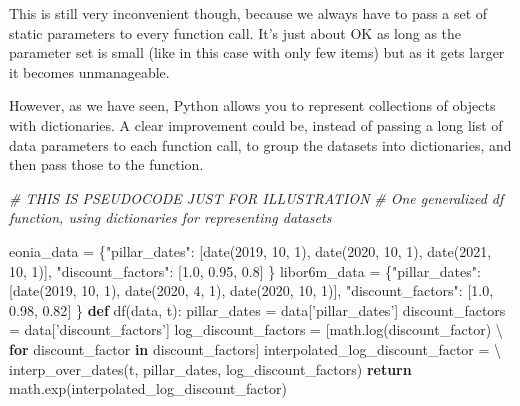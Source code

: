 \documentclass[11pt]{article}
\newenvironment{Shaded}{}{}
\newcommand{\KeywordTok}[1]{\textcolor[rgb]{0.00,0.44,0.13}{\textbf{{#1}}}}
\newcommand{\DecValTok}[1]{\textcolor[rgb]{0.25,0.63,0.44}{{#1}}}
\newcommand{\FloatTok}[1]{\textcolor[rgb]{0.25,0.63,0.44}{{#1}}}
\newcommand{\StringTok}[1]{\textcolor[rgb]{0.25,0.44,0.63}{{#1}}}
\newcommand{\CommentTok}[1]{\textcolor[rgb]{0.38,0.63,0.69}{\textit{{#1}}}}
\newcommand{\NormalTok}[1]{{#1}}
\newcommand{\ControlFlowTok}[1]{\textcolor[rgb]{0.00,0.44,0.13}{\textbf{{#1}}}}
\newcommand{\OperatorTok}[1]{\textcolor[rgb]{0.40,0.40,0.40}{{#1}}}
\begin{document}
    This is still very inconvenient though, because we always have to pass a
set of static parameters to every function call. It's just about OK as
long as the parameter set is small (like in this case with only few
items) but as it gets larger it becomes unmanageable.

However, as we have seen, Python allows you to represent collections of
objects with dictionaries. A clear improvement could be, instead of
passing a long list of data parameters to each function call, to group
the datasets into dictionaries, and then pass those to the function.

    \begin{Shaded}
\begin{Highlighting}[]
\CommentTok{# THIS IS PSEUDOCODE JUST FOR ILLUSTRATION}
\CommentTok{# One generalized df function, using dictionaries for representing datasets}

\NormalTok{eonia_data }\OperatorTok{=}\NormalTok{ \{}\StringTok{"pillar_dates"}\NormalTok{: [date(}\DecValTok{2019}\NormalTok{, }\DecValTok{10}\NormalTok{, }\DecValTok{1}\NormalTok{), }
\NormalTok{                               date(}\DecValTok{2020}\NormalTok{, }\DecValTok{10}\NormalTok{, }\DecValTok{1}\NormalTok{),  }
\NormalTok{                               date(}\DecValTok{2021}\NormalTok{, }\DecValTok{10}\NormalTok{, }\DecValTok{1}\NormalTok{)],}
              \StringTok{"discount_factors"}\NormalTok{: [}\FloatTok{1.0}\NormalTok{, }\FloatTok{0.95}\NormalTok{, }\FloatTok{0.8}\NormalTok{]}
\NormalTok{             \}}
\NormalTok{libor6m_data }\OperatorTok{=}\NormalTok{ \{}\StringTok{"pillar_dates"}\NormalTok{: [date(}\DecValTok{2019}\NormalTok{, }\DecValTok{10}\NormalTok{, }\DecValTok{1}\NormalTok{), }
\NormalTok{                                 date(}\DecValTok{2020}\NormalTok{, }\DecValTok{4}\NormalTok{, }\DecValTok{1}\NormalTok{), }
\NormalTok{                                 date(}\DecValTok{2020}\NormalTok{, }\DecValTok{10}\NormalTok{, }\DecValTok{1}\NormalTok{)],}
                \StringTok{"discount_factors"}\NormalTok{: [}\FloatTok{1.0}\NormalTok{, }\FloatTok{0.98}\NormalTok{, }\FloatTok{0.82}\NormalTok{]}
\NormalTok{             \}}
\KeywordTok{def}\NormalTok{ df(data, t):}
\NormalTok{    pillar_dates }\OperatorTok{=}\NormalTok{ data[}\StringTok{'pillar_dates'}\NormalTok{]}
\NormalTok{    discount_factors }\OperatorTok{=}\NormalTok{ data[}\StringTok{'discount_factors'}\NormalTok{]}
\NormalTok{    log_discount_factors }\OperatorTok{=}\NormalTok{ [math.log(discount_factor) }\OperatorTok{\textbackslash{}}
        \ControlFlowTok{for}\NormalTok{ discount_factor }\KeywordTok{in}\NormalTok{ discount_factors]}
\NormalTok{    interpolated_log_discount_factor }\OperatorTok{=} \OperatorTok{\textbackslash{}}
\NormalTok{        interp_over_dates(t, pillar_dates, log_discount_factors)}
    \ControlFlowTok{return}\NormalTok{ math.exp(interpolated_log_discount_factor)}


\end{Highlighting}
\end{Shaded}
\end{document}
